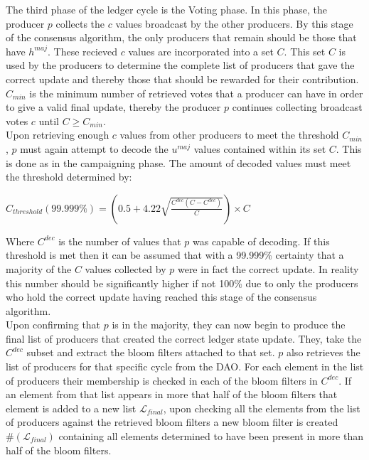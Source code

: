 The third phase of the ledger cycle is the Voting phase. In this phase, the producer $p$ collects the $c$ values broadcast by the other producers. By this stage of the consensus algorithm, the only producers that remain should be those that have $h^{maj}$. These recieved $c$ values are incorporated into a set $C$. This set $C$ is used by the producers to determine the complete list of producers that gave the correct update and thereby those that should be rewarded for their contribution. $C_{min}$ is the minimum number of retrieved votes that a producer can have in order to give a valid final update, thereby the producer $p$ continues collecting broadcast votes $c$ until $C \geq C_{min}$. \\


Upon retrieving enough $c$ values from other producers to meet the threshold $C_{min}$, $p$ must again attempt to decode the $u^{maj}$ values contained within its set $C$. This is done as in the campaigning phase. The amount of decoded values must meet the threshold determined by:  

\begin{center} 
$C_{threshold}(99.999\%) = \left( 0.5 + 4.22\sqrt{\frac{C^{dec}(C-C^{dec})}{C}}\right) \times C$
\end{center} 

Where $C^{dec}$ is the number of values that $p$ was capable of decoding. If this threshold is met then it can be assumed that with a 99.999\% certainty that a majority of the $C$ values collected by $p$ were in fact the correct update. In reality this number should be significantly higher if not 100\% due to only the producers who hold the correct update having reached this stage of the consensus algorithm. \\

Upon confirming that $p$ is in the majority, they can now begin to produce the final list of producers that created the correct ledger state update. They, take the $C^{dec}$ subset and extract the bloom filters attached to that set. $p$ also retrieves the list of producers for that specific cycle from the DAO. For each element in the list of producers their membership is checked in each of the bloom filters in $C^{dec}$. If an element from that list appears in more that half of the bloom filters that element is added to a new list $\mathcal{L}_{final}$, upon checking all the elements from the list of producers against the retrieved bloom filters a new bloom filter is created $\#(\mathcal{L}_{final})$ containing all elements determined to have been present in more than half of the bloom filters. 
